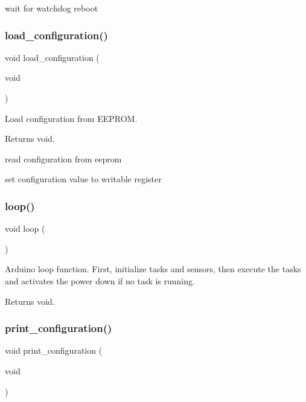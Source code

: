 wait for watchdog reboot \mbox{\label{i2c-rain_8ino_a32a64a2800c724fb28e10636f2ec20b9}} 
\subsubsection{\texorpdfstring{load\+\_\+configuration()}{load\_configuration()}}
{\footnotesize\ttfamily void load\+\_\+configuration (\begin{DoxyParamCaption}\item[{void}]{ }\end{DoxyParamCaption})}



Load configuration from E\+E\+P\+R\+OM. 

\begin{DoxyReturn}{Returns}
void. 
\end{DoxyReturn}
read configuration from eeprom

set configuration value to writable register \mbox{\label{i2c-rain_8ino_afe461d27b9c48d5921c00d521181f12f}} 
\subsubsection{\texorpdfstring{loop()}{loop()}}
{\footnotesize\ttfamily void loop (\begin{DoxyParamCaption}{ }\end{DoxyParamCaption})}



Arduino loop function. First, initialize tasks and sensors, then execute the tasks and activates the power down if no task is running. 

\begin{DoxyReturn}{Returns}
void. 
\end{DoxyReturn}
\mbox{\label{i2c-rain_8ino_a65b2dadc0411e43874ec8ed7f73bc62a}} 
\subsubsection{\texorpdfstring{print\+\_\+configuration()}{print\_configuration()}}
{\footnotesize\ttfamily void print\+\_\+configuration (\begin{DoxyParamCaption}\item[{void}]{ }\end{DoxyParamCaption})}



